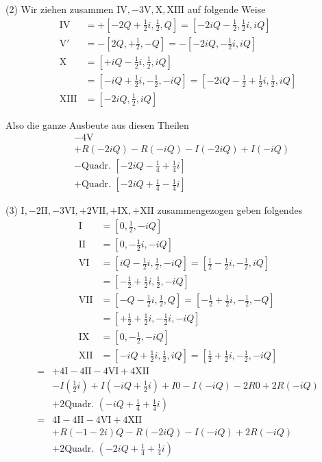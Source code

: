 (2) Wir ziehen zusammen $\mathrm{IV},-3\mathrm{V},\mathrm{X},\mathrm{XIII}$ auf folgende Weise
\[
\begin{aligned}
\mathrm{IV}&=+[-2Q+\tfrac12i,\tfrac12,Q]=[-2iQ-\tfrac12,\tfrac12i,iQ]\\
\mathrm{V}'&=-[2Q,+\tfrac12,-Q]=-[-2iQ,-\tfrac12i,iQ]\\
\mathrm{X}&=[+iQ-\tfrac12i,\tfrac12,iQ]\\
&=[-iQ+\tfrac12i,-\tfrac12,-iQ]=[-2iQ-\tfrac12+\tfrac12i,\tfrac12,iQ]\\
\mathrm{XIII}&=[-2iQ,\tfrac12,iQ]
\end{aligned}
\]

%
Also die ganze Ausbeute aus diesen Theilen
\[
\begin{aligned}
&-4\mathrm{V}\\
&+R(-2iQ)-R(-iQ)-I(-2iQ)+I(-iQ)\\
&-\text{Quadr. }[-2iQ-\tfrac14+\tfrac14i]\\
&+\text{Quadr. }[-2iQ+\tfrac14-\tfrac14i]
\end{aligned}
\]

(3) $\mathrm{I},-2\mathrm{II},-3\mathrm{VI},+2\mathrm{VII},+\mathrm{IX},+\mathrm{XII}$ zusammengezogen geben folgendes
\[
\begin{aligned}
\mathrm{I}&=[0,\tfrac12,-iQ]\\
\mathrm{II}&=[0,-\tfrac12i,-iQ]\\
\mathrm{VI}&=[iQ-\tfrac12i,\tfrac12,-iQ]=[\tfrac12-\tfrac12i,-\tfrac12,iQ]\\
&=[-\tfrac12+\tfrac12i,\tfrac12,-iQ]\\
\mathrm{VII}&=[-Q-\tfrac12i,\tfrac12,Q]=[-\tfrac12+\tfrac12i,-\tfrac12,-Q]\\
&=[+\tfrac12+\tfrac12i,-\tfrac12i,-iQ]\\
\mathrm{IX}&=[0,-\tfrac12,-iQ]\\
\mathrm{XII}&=[-iQ+\tfrac12i,\tfrac12,iQ]=[\tfrac12+\tfrac12i,-\tfrac12,-iQ]
\end{aligned}
\]
\[
\begin{aligned}
={}&+4\mathrm{I}-4\mathrm{II}-4\mathrm{VI}+4\mathrm{XII}\\
&-I(\tfrac12i)+I(-iQ+\tfrac12i)+I0-I(-iQ)-2R0+2R(-iQ)\\
&+2\text{Quadr. }(-iQ+\tfrac14+\tfrac14i)\\
={}&4\mathrm{I}-4\mathrm{II}-4\mathrm{VI}+4\mathrm{XII}\\
&+R(-1-2i)Q-R(-2iQ)-I(-iQ)+2R(-iQ)\\
&+2\text{Quadr. }(-2iQ+\tfrac14+\tfrac14i)
\end{aligned}
\]

